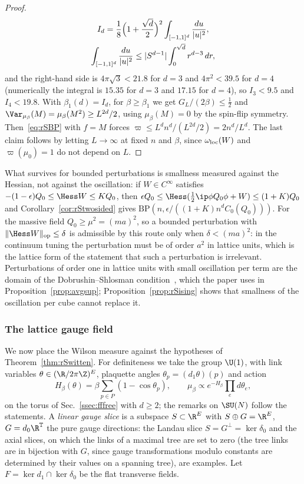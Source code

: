 \begin{proof}
\begin{gather*}
I_d=\frac18\Bigl(1+\frac{\sqrt d}2\Bigr)^2\int_{[-1,1]^d}\frac{du}{\lvert u
\rvert^2},\\
\int_{[-1,1]^d}\frac{du}{\lvert u\rvert^2}\le\lvert S^{d-1}
\rvert\int_0^{\sqrt d}r^{d-3}\,dr,
\end{gather*}
and the right-hand side is $4\pi\sqrt3<21.8$ for $d=3$ and $4\pi^2<39.5$ for
$d=4$ (numerically the integral is $15.35$ for $d=3$ and $17.15$ for $d=4$),
so $I_3<9.5$ and $I_4<19.8$. With $\beta_1(d)=
I_d$, for $\beta\ge\beta_1$ we get $G_L/(2\beta)\le\frac12$ and
$\Var_{\mu_\beta}(M)=\mu_\beta(M^2)\ge L^{2d}/2$, using $\mu_\beta(M)=0$ by
the spin-flip symmetry. Then~\eqref{eq:rSBP} with $f=M$ forces $\varpi\le
L^dn^d/(L^{2d}/2)=2n^d/L^d$. The last claim follows by letting $L\to\infty$
at fixed $n$ and $\beta$, since $\omega_{\rm loc}(W)$ and $\varpi(\mu_0)=1$
do not depend on $L$.
\end{proof}

What survives for bounded perturbations is smallness measured against the
Hessian, not against the oscillation: if $W\in C^\infty$ satisfies $-(1-
\epsilon)Q_0\le\Hess W\le KQ_0$, then $\epsilon Q_0\le\Hess(\tfrac12\ip\phi
{Q_0\phi}+W)\le(1+K)Q_0$ and Corollary~\ref{cor:rStwosided} gives
$\mathrm{BP}(n,\epsilon/((1+K)n^dC_0(Q_0)))$. For the massive field $Q_0\ge
\mu^2=(ma)^2$, so a bounded perturbation with $\lVert\Hess W\rVert_{\rm op}
\le\delta$ is admissible by this route only when $\delta<(ma)^2$: in the
continuum tuning the perturbation must be of order $a^2$ in lattice units,
which is the lattice form of the statement that such a perturbation is
irrelevant. Perturbations of order one in lattice units with small
oscillation per term are the domain of the Dobrushin--Shlosman
condition~\cite{Dob68,DS85}, which the paper uses in
Proposition~\ref{prop:avgsup}; Proposition~\ref{prop:rSising} shows that
smallness of the oscillation per cube cannot replace it.

\subsubsection{The lattice gauge field}\label{sssec:rSgauge}

We now place the Wilson measure against the hypotheses of
Theorem~\ref{thm:rSwitten}. For definiteness we take the group $\U(1)$, with
link variables $\theta\in(\R/2\pi\Z)^E$, plaquette angles $\theta_p=(d_1
\theta)(p)$ and action
\[
H_\beta(\theta)=\beta\sum_{p\in P}(1-\cos\theta_p),\qquad\mu_\beta\propto
e^{-H_\beta}\prod_ed\theta_e ,
\]
on the torus of Sec.~\ref{ssec:fffree} with $d\ge2$; the remarks on $\SU(N)$
follow the statements. A \emph{linear gauge slice} is a subspace $S\subset
\R^E$ with $S\oplus G=\R^E$, $G=d_0\R^{\mathbb T}$ the pure gauge directions:
the Landau slice $S=G^\perp=\ker\delta_0$ and the axial slices, on which the
links of a maximal tree are set to zero (the tree links are in bijection
with $G$, since gauge transformations modulo constants are determined by
their values on a spanning tree), are examples. Let $F=\ker d_1\cap\ker
\delta_0$ be the flat transverse fields.

